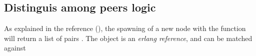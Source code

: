 \subsection{Distinguis among peers logic} \label{sub:DistinguishAmongPeersLogic}

As explained in the  reference (), the spawning of a new node with the
 function will return a list of pairs . The  object is an
\emph{erlang reference}, and can be matched against
